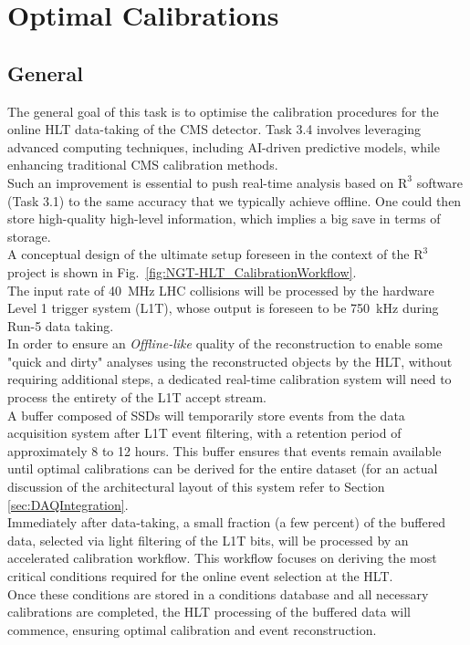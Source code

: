 \chapter{Optimal Calibrations}
\section{General} %

The general goal of this task is to optimise the calibration procedures for the online HLT data-taking of the CMS detector. Task 3.4 involves leveraging advanced computing techniques, including AI-driven predictive models, while enhancing traditional CMS calibration methods. \\
Such an improvement is essential to push real-time analysis based on $\mathrm{R}^3$ software (Task 3.1) to the same accuracy that we typically achieve offline. One could then store high-quality high-level information, which implies a big save in terms of storage.\\
\newline
A conceptual design of the ultimate setup foreseen in the context of the $\mathrm{R}^3$  project is shown in  Fig.~\ref{fig:NGT-HLT_CalibrationWorkflow}. \\
The input rate of \SI{40}{\mega\hertz} LHC collisions will be processed by the hardware Level 1 trigger system (L1T), whose output is foreseen to be \SI{750}{\kilo\hertz} during Run-\num{5} data taking. \\
\newline
In order to ensure an \emph{Offline-like} quality of the reconstruction to enable some "quick and dirty" analyses using the reconstructed objects by the HLT, without requiring additional steps, a dedicated real-time calibration system will need to process the entirety of the L1T accept stream.\\  
A buffer composed of SSDs will temporarily store events from the data acquisition system after L1T event filtering, with a retention period of approximately 8 to 12 hours. This buffer ensures that events remain available until optimal calibrations can be derived for the entire dataset (for an actual discussion of the architectural layout of this system refer to Section \ref{sec:DAQIntegration}.\\
\newline
Immediately after data-taking, a small fraction (a few percent) of the buffered data, selected via light filtering of the L1T bits, will be processed by an accelerated calibration workflow. This workflow focuses on deriving the most critical conditions required for the online event selection at the HLT.\\
Once these conditions are stored in a conditions database and all necessary calibrations are completed, the HLT processing of the buffered data will commence, ensuring optimal calibration and event reconstruction. 

